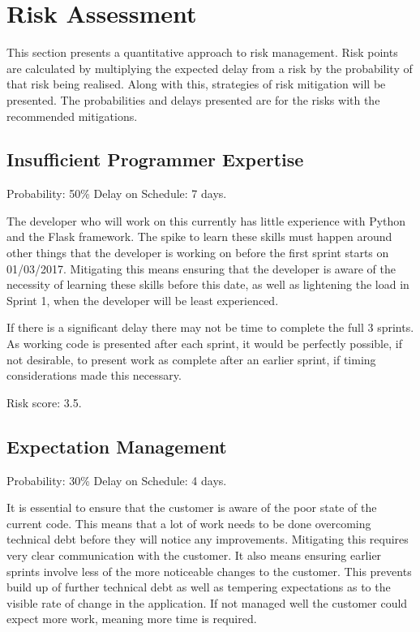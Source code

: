 \documentclass[a4paper,12pt]{article}
\begin{document}
\section{Risk Assessment}
This section presents a quantitative approach to risk management. Risk points are calculated by multiplying the expected delay from a risk by the probability of that risk being realised. Along with this, strategies of risk mitigation will be presented. The probabilities and delays presented are for the risks with the recommended mitigations.

\subsection{Insufficient Programmer Expertise}
Probability: 50\% \hfill Delay on Schedule: 7 days.

The developer who will work on this currently has little experience with Python and the Flask framework. The spike to learn these skills must happen around other things that the developer is working on before the first sprint starts on 01/03/2017. Mitigating this means ensuring that the developer is aware of the necessity of learning these skills before this date, as well as lightening the load in Sprint 1, when the developer will be least experienced.

If there is a significant delay there may not be time to complete the full 3 sprints. As working code is presented after each sprint, it would be perfectly possible, if not desirable, to present work as complete after an earlier sprint, if timing considerations made this necessary.

Risk score: 3.5.

\subsection{Expectation Management}
Probability: 30\% \hfill Delay on Schedule: 4 days.

It is essential to ensure that the customer is aware of the poor state of the current code. This means that a lot of work needs to be done overcoming technical debt before they will notice any improvements. Mitigating this requires very clear communication with the customer. It also means ensuring earlier sprints involve less of the more noticeable changes to the customer. This prevents build up of further technical debt as well as tempering expectations as to the visible rate of change in the application. If not managed well the customer could expect more work, meaning more time is required.
\end{document}
